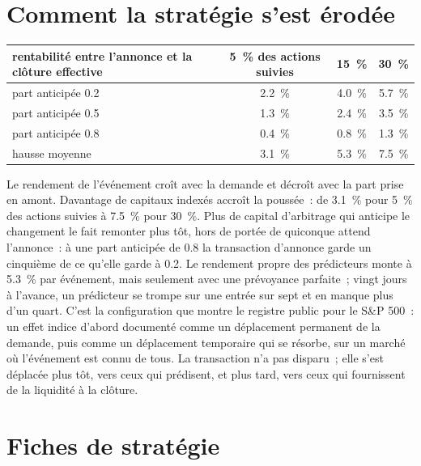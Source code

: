 \section{Comment la stratégie s'est érodée}

\begin{center}
\small
\begin{tabular}{@{}lccc@{}}
\toprule
rentabilité entre l'annonce et la clôture effective & 5~\% des actions suivies & 15~\% & 30~\%\\
\midrule
part anticipée 0.2 & 2.2~\% & 4.0~\% & 5.7~\%\\
part anticipée 0.5 & 1.3~\% & 2.4~\% & 3.5~\%\\
part anticipée 0.8 & 0.4~\% & 0.8~\% & 1.3~\%\\
\midrule
hausse moyenne & 3.1~\% & 5.3~\% & 7.5~\%\\
\bottomrule
\end{tabular}
\end{center}

Le rendement de l'événement croît avec la demande et décroît avec la part prise en amont. Davantage de capitaux indexés accroît la poussée~: de 3.1~\% pour 5~\% des actions suivies à
7.5~\% pour 30~\%. Plus de capital d'arbitrage qui anticipe le changement le fait remonter plus tôt, hors de portée de quiconque attend l'annonce~: à une part anticipée de 0.8
la transaction d'annonce garde un cinquième de ce qu'elle garde à 0.2. Le rendement propre des prédicteurs monte à 5.3~\% par événement, mais seulement avec une prévoyance parfaite~; vingt
jours à l'avance, un prédicteur se trompe sur une entrée sur sept et en manque plus d'un quart. C'est la configuration que montre le registre public pour le S\&P 500~: un
effet indice d'abord documenté comme un déplacement permanent de la demande, puis comme un déplacement temporaire qui se résorbe, sur un marché où l'événement est connu de tous. La
transaction n'a pas disparu~; elle s'est déplacée plus tôt, vers ceux qui prédisent, et plus tard, vers ceux qui fournissent de la liquidité à la clôture.

\section{Fiches de stratégie}

